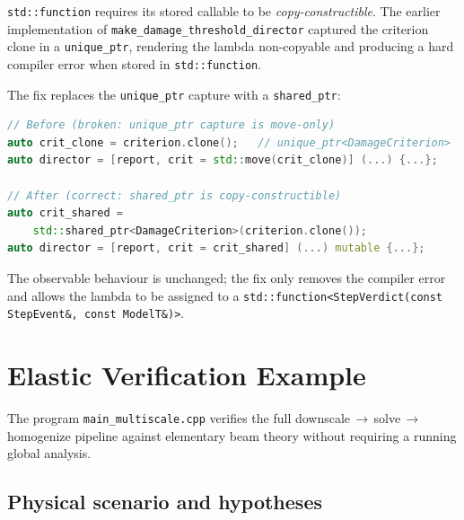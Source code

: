 \texttt{std::function} requires its stored callable to be
\emph{copy-constructible}.  The earlier implementation of
\texttt{make\_damage\_threshold\_director} captured the criterion clone
in a \texttt{unique\_ptr}, rendering the lambda non-copyable and producing
a hard compiler error when stored in \texttt{std::function}.

The fix replaces the \texttt{unique\_ptr} capture with a
\texttt{shared\_ptr}:

\begin{lstlisting}[language=C++,caption={TransitionDirector.hh -- shared\_ptr fix},
                   label={lst:transition_fix}]
// Before (broken: unique_ptr capture is move-only)
auto crit_clone = criterion.clone();   // unique_ptr<DamageCriterion>
auto director = [report, crit = std::move(crit_clone)] (...) {...};

// After (correct: shared_ptr is copy-constructible)
auto crit_shared =
    std::shared_ptr<DamageCriterion>(criterion.clone());
auto director = [report, crit = crit_shared] (...) mutable {...};
\end{lstlisting}

The observable behaviour is unchanged; the fix only removes the compiler
error and allows the lambda to be assigned to a
\texttt{std::function<StepVerdict(const StepEvent\&, const ModelT\&)>}.


\section{Elastic Verification Example}
\label{sec:elastic_multiscale_example}

The program \texttt{main\_multiscale.cpp} verifies the full
downscale$\,\to\,$solve$\,\to\,$homogenize pipeline against elementary
beam theory without requiring a running global analysis.

\subsection{Physical scenario and hypotheses}

